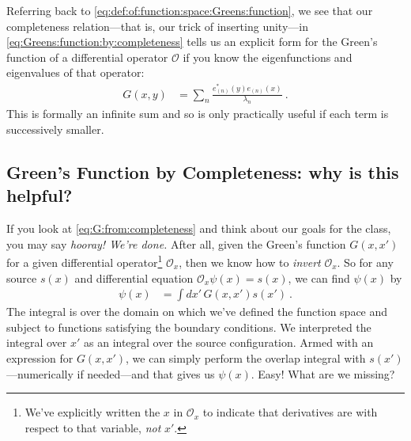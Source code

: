 Referring back to \eqref{eq:def:of:function:space:Greens:function}, 
we see that our completeness relation---that is, our trick of inserting unity---in \eqref{eq:Greens:function:by:completeness} tells us an explicit form for the Green's function of a differential operator $\mathcal O$ if you know the eigenfunctions and eigenvalues of that operator:
\begin{align}
	G(x,y) &= \sum_n \frac{e_{(n)}^*(y) e_{(n)}(x)}{\lambda_n} \ .
	\label{eq:G:from:completeness}
\end{align}
This is formally an infinite sum and so is only practically useful if each term is successively smaller. 


\subsection{Green's Function by Completeness: why is this helpful?}
\label{sec:Greens:fuctions:by:completeness}

If you look at \eqref{eq:G:from:completeness} and think about our goals for the class, you may say \emph{hooray! We're done.} After all, given the Green's function $G(x,x')$ for a given differential operator\footnote{We've explicitly written the $x$ in $\mathcal O_x$ to indicate that derivatives are with respect to that variable, \emph{not} $x'$.} $\mathcal O_x$, then we know how to \emph{invert} $\mathcal O_x$. So for any source $s(x)$ and differential equation $\mathcal O_x \psi(x) = s(x)$, we can find $\psi(x)$ by
\begin{align}
	\psi(x) &= \int dx' \, G(x,x') s(x') \ .
\end{align}
The integral is over the domain on which we've defined the function space and subject to functions satisfying the boundary conditions. We interpreted the integral over $x'$ as an integral over the source configuration. Armed with an expression for $G(x,x')$, we can simply perform the overlap integral with $s(x')$---numerically if needed---and that gives us $\psi(x)$. Easy! What are we missing?

